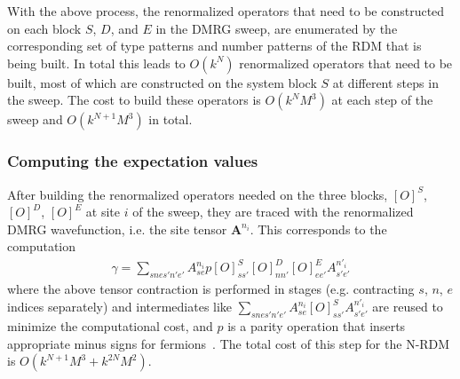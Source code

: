
With the above process, the renormalized operators that need to be constructed  on each block $S$, $D$, and $E$ 
in the DMRG sweep, are enumerated
by the corresponding set of type patterns and number patterns of the RDM that is being built. In total this leads to $O(k^N)$ renormalized
operators that need to be built, most of which are constructed on the system block $S$ at different steps in the sweep. The cost to build these operators 
is $O(k^NM^3)$ at each step of the sweep and $O(k^{N+1}M^3)$ in total.   

\subsubsection{Computing the expectation values}

After building the renormalized operators needed on the three blocks, $[O]^S$, $[O]^D$, $[O]^E$ at site $i$ of the sweep, they are
traced with the renormalized DMRG wavefunction, i.e. the site tensor $\mathbf{A}^{n_i}$. 
This corresponds to the computation
\begin{align}
\gamma = \sum_{snes'n'e'} A^{n_i}_{se} p [O]^S_{ss'} [O]^D_{nn'} [O]^E_{ee'} A^{n'_i}_{s'e'} 
\end{align}
where the above tensor contraction is performed in stages (e.g. contracting $s$, $n$, $e$ indices separately) and intermediates like $\sum_{snes'n'e'}A^{n_i}_{se}[O]^S_{ss'}A^{n'_i}_{s'e'}$ are reused to minimize the computational cost,
and $p$ is a parity operation that inserts appropriate minus signs for fermions~\cite{chan_highly_2002}. 
The total cost of this step for the N-RDM is $O(k^{N+1}M^3+k^{2N}M^2)$.


